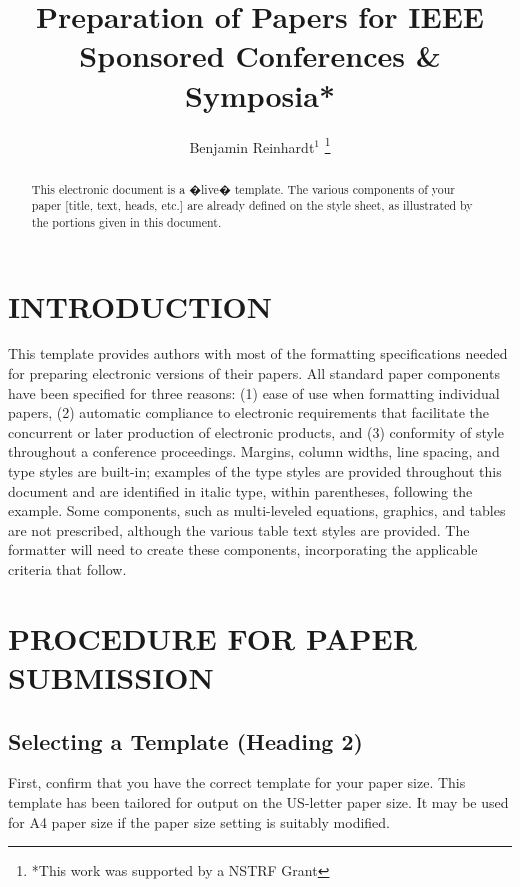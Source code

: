 \documentclass[letterpaper, 10 pt, conference]{ieeeconf}  %
\title{\LARGE \bf
Preparation of Papers for IEEE Sponsored Conferences \& Symposia*
}
\author{Benjamin Reinhardt$^{1}$ %
\thanks{*This work was supported by a NSTRF Grant}%
}
\begin{document}
\maketitle
\thispagestyle{empty}
\pagestyle{empty}


\begin{abstract}

This electronic document is a �live� template. The various components of your paper [title, text, heads, etc.] are already defined on the style sheet, as illustrated by the portions given in this document.

\end{abstract}


\section{INTRODUCTION}

This template provides authors with most of the formatting specifications needed for preparing electronic versions of their papers. All standard paper components have been specified for three reasons: (1) ease of use when formatting individual papers, (2) automatic compliance to electronic requirements that facilitate the concurrent or later production of electronic products, and (3) conformity of style throughout a conference proceedings. Margins, column widths, line spacing, and type styles are built-in; examples of the type styles are provided throughout this document and are identified in italic type, within parentheses, following the example. Some components, such as multi-leveled equations, graphics, and tables are not prescribed, although the various table text styles are provided. The formatter will need to create these components, incorporating the applicable criteria that follow.

\section{PROCEDURE FOR PAPER SUBMISSION}

\subsection{Selecting a Template (Heading 2)}

First, confirm that you have the correct template for your paper size. This template has been tailored for output on the US-letter paper size. 
It may be used for A4 paper size if the paper size setting is suitably modified.
\end{document}
